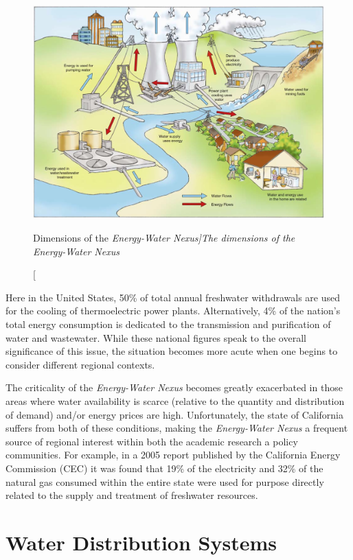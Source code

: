      \begin{figure}[Dimensions of the \it{Energy-Water Nexus}]
       \centering
       \includegraphics[width=5.5in]{figures/energy-water-nexus-dimensions.png}
       \caption[Dimensions of the \it{Energy-Water Nexus}]{The dimensions of the \it{Energy-Water Nexus}}
       \label{fig:energy-water-dimensions}
     \end{figure}
    
Here in the United States, 50\% of total annual freshwater withdrawals are used for the cooling of thermoelectric power plants. Alternatively, 4\% of the nation's total energy consumption is dedicated to the transmission and purification of water and wastewater. While these national figures speak to the overall significance of this issue, the situation becomes more acute when one begins to consider different regional contexts. 
    
The criticality of the \textit{Energy-Water Nexus} becomes greatly exacerbated in those areas where water availability is scarce (relative to the quantity and distribution of demand) and/or energy prices are high. Unfortunately, the state of California suffers from both of these conditions, making the \textit{Energy-Water Nexus} a frequent source of regional interest within both the academic research a policy communities. For example, in a 2005 report published by the California Energy Commission (CEC) it was found that 19\% of the electricity and 32\% of the natural gas consumed within the entire state were used for purpose directly related to the supply and treatment of freshwater resources.
    
\section{Water Distribution Systems}
    
